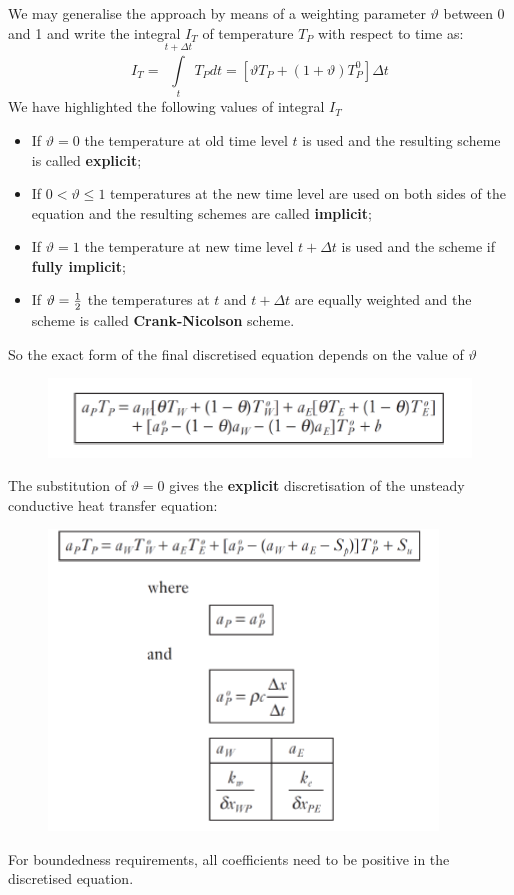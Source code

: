 \documentclass[a4paper, 15pt]{article}
\begin{document}
We may generalise the approach by means of a weighting parameter $\vartheta$ between 0 and 1 and
write the integral $I_T$ of temperature $T_P$ with respect to time as:
\[I_T = \int\limits_{t}^{t+\Delta t}T_Pdt = [\vartheta T_P + (1+\vartheta)T_P^0]\Delta t\]
We
have highlighted the following values of integral $I_T$ 
\begin{itemize}
	\item If $\vartheta =0$ the temperature at old time level $t$ is used and the resulting scheme is called \textbf{explicit};
	\item If $0<\vartheta \leq 1$ temperatures at the new time level are used on both sides of the equation and
	the resulting schemes are called \textbf{implicit};
	\item If $\vartheta = 1$ the temperature at new time level $t + \Delta t$ is used and the scheme if \textbf{fully implicit};
	\item If $\vartheta = {1\over2}$ the temperatures at $t$ and $t + \Delta t$ are equally weighted and the scheme is called \textbf{Crank-Nicolson} scheme.
\end{itemize} 
So the
exact form of the final discretised equation depends on the value of $\vartheta$
\begin{figure}[H]
	\centering
	\label{fig:screenshot027}
	\includegraphics[width=0.5\linewidth]{fig/screenshot027}
\end{figure}

The substitution of  $\vartheta =0$ gives the \textbf{explicit} discretisation of the unsteady conductive heat
transfer equation:
\begin{figure}[H]
	\centering
	\includegraphics[width=0.5\linewidth]{fig/screenshot028}
	\label{fig:screenshot028}
\end{figure}

For
boundedness requirements, all coefficients need to be positive in the discretised equation.
\end{document}
